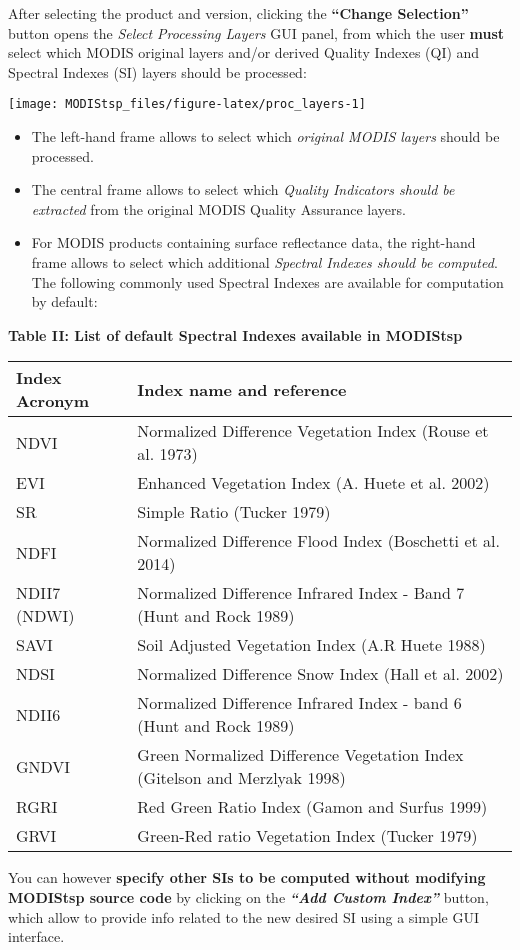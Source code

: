 \documentclass[]{article}
\providecommand{\tightlist}{%
  \setlength{\itemsep}{0pt}\setlength{\parskip}{0pt}}
\begin{document}
After selecting the product and version, clicking the \textbf{``Change
Selection''} button opens the \emph{\emph{Select Processing Layers}} GUI
panel, from which the user \textbf{must} select which MODIS original
layers and/or derived Quality Indexes (QI) and Spectral Indexes (SI)
layers should be processed:

\begin{center}\texttt{[image: MODIStsp\_files/figure-latex/proc\_layers-1]} \end{center}

\begin{itemize}
\tightlist
\item
  The left-hand frame allows to select which \emph{original MODIS
  layers} should be processed.
\item
  The central frame allows to select which \emph{Quality Indicators
  should be extracted} from the original MODIS Quality Assurance layers.
\item
  For MODIS products containing surface reflectance data, the right-hand
  frame allows to select which additional \emph{Spectral Indexes should
  be computed}. The following commonly used Spectral Indexes are
  available for computation by default:
\end{itemize}

\textbf{Table II: List of default Spectral Indexes available in
MODIStsp}

\begin{longtable}[]{@{}ll@{}}
\toprule
Index Acronym & Index name and reference\tabularnewline
\midrule
\endhead
NDVI & Normalized Difference Vegetation Index (Rouse et al.
1973)\tabularnewline
EVI & Enhanced Vegetation Index (A. Huete et al. 2002)\tabularnewline
SR & Simple Ratio (Tucker 1979)\tabularnewline
NDFI & Normalized Difference Flood Index (Boschetti et al.
2014)\tabularnewline
NDII7 (NDWI) & Normalized Difference Infrared Index - Band 7 (Hunt and
Rock 1989)\tabularnewline
SAVI & Soil Adjusted Vegetation Index (A.R Huete 1988)\tabularnewline
NDSI & Normalized Difference Snow Index (Hall et al.
2002)\tabularnewline
NDII6 & Normalized Difference Infrared Index - band 6 (Hunt and Rock
1989)\tabularnewline
GNDVI & Green Normalized Difference Vegetation Index (Gitelson and
Merzlyak 1998)\tabularnewline
RGRI & Red Green Ratio Index (Gamon and Surfus 1999)\tabularnewline
GRVI & Green-Red ratio Vegetation Index (Tucker 1979)\tabularnewline
\bottomrule
\end{longtable}

You can however \textbf{specify other SIs to be computed without
modifying MODIStsp source code} by clicking on the \emph{\textbf{``Add
Custom Index''}} button, which allow to provide info related to the new
desired SI using a simple GUI interface.
\end{document}
